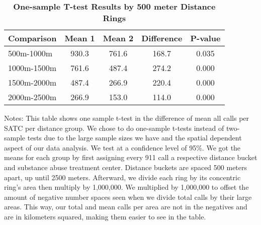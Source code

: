 \begin{table}[htbp]
\centering
\begin{tabular}{l|c c c c}
\hline
Comparison & Mean 1 & Mean 2 & Difference & P-value \\
\hline
500m-1000m & 930.3 & 761.6 & 168.7 & 0.035 \\
1000m-1500m & 761.6 & 487.4 & 274.2 & 0.000 \\
1500m-2000m & 487.4 & 266.9 & 220.4 & 0.000 \\
2000m-2500m & 266.9 & 153.0 & 114.0 & 0.000 \\
\hline
\end{tabular}
\caption{\textbf{One-sample T-test Results by 500 meter Distance Rings}}
\label{tab:ttests_500}
\centering\footnotesize{Notes: This table shows one sample t-test in the difference of mean all calls per SATC per distance group.  We chose to do one-sample t-tests instead of two-sample tests due to the large sample sizes we have and the spatial dependent aspect of our data analysis. We test at a confidence level of 95\%. We got the means for each group by first assigning every 911 call a respective distance bucket and substance abuse treatment center. Distance buckets are spaced 500 meters apart, up until 2500 meters. Afterward, we divide each ring by its concentric ring's area then multiply by 1,000,000. We multiplied by 1,000,000 to offset the amount of negative number spaces seen when we divide total calls by their large areas. This way, our total and mean calls per area are not in the negatives and are in kilometers squared, making them easier to see in the table.}
\end{table}
